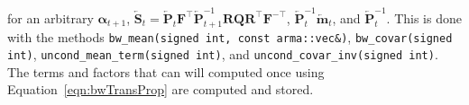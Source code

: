\documentclass[notitlepage]{article}
\renewcommand{\vec}[1]{\bm{#1}}
\newcommand{\vecLarrow}[1]{\overleftarrow{\vec{#1}}}
\newcommand{\mat}[1]{\mathbf{#1}}
\newcommand{\matLarrow}[1]{\overleftarrow{\mat{#1}}}
\begin{document}
%
for an arbitrary $\vec{\alpha}_{t+1}$, %
$\matLarrow{S}_t = \matLarrow{P}_t\mat{F}^\top\matLarrow{P}_{t + 1}^{-1}\mat{R}\mat{Q}\mat{R}^\top\mat{F}^{-\top}$, %
$\matLarrow{P}_t^{-1}\vecLarrow{m}_t$, and $\matLarrow{P}_t^{-1}$. This is done with the methods 
\texttt{bw\_mean(signed int, const arma::vec\&)}, %
\texttt{bw\_covar(signed int)}, %
\texttt{uncond\_mean\_term(\allowbreak signed int)}, and 
\texttt{uncond\_covar\_inv(\allowbreak  signed int)}. 
The terms and factors that can will computed once using 
Equation~\eqref{eqn:bwTransProp} are computed and stored.





\newpage


\end{document}
